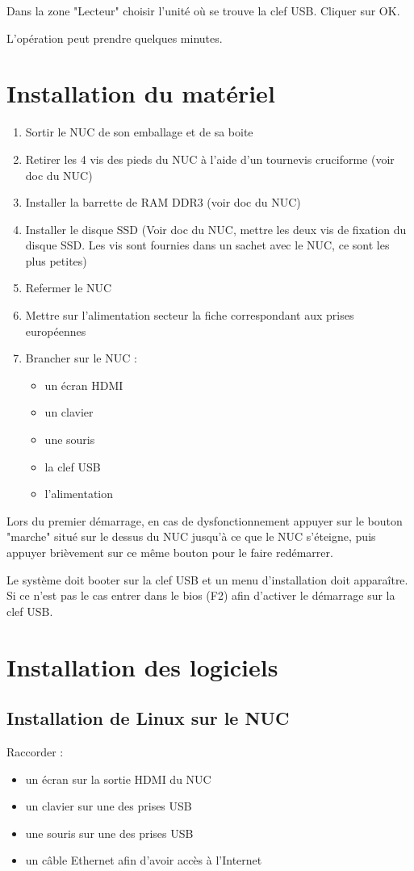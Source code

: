 \documentclass[a4paper]{ffco-rapport}
\begin{document}
Dans la zone "Lecteur" choisir l'unité où se trouve la clef USB. Cliquer sur OK.

L'opération peut prendre quelques minutes.

\chapter{Installation du matériel}

\begin{enumerate}
	\item Sortir le NUC de son emballage et de sa boite
	\item Retirer les 4 vis des pieds du NUC à l'aide d'un tournevis cruciforme (voir doc du NUC)
	\item Installer la barrette de RAM DDR3 (voir doc du NUC)
	\item Installer le disque SSD (Voir doc du NUC, mettre les deux vis de fixation du disque SSD. Les vis sont fournies dans un sachet avec le NUC, ce sont les plus petites)
	\item Refermer le NUC
	\item Mettre sur l'alimentation secteur la fiche correspondant aux prises européennes
	\item Brancher sur le NUC :
	\begin{itemize}
		\item un écran HDMI
		\item un clavier
		\item une souris
		\item la clef USB
		\item l'alimentation
	\end{itemize}
\end{enumerate}

Lors du premier démarrage, en cas de dysfonctionnement appuyer sur le bouton "marche" situé sur le dessus du NUC jusqu'à ce que le NUC s'éteigne, puis appuyer brièvement sur ce même bouton pour le faire redémarrer.

Le système doit booter sur la clef USB et un menu d'installation doit apparaître. Si ce n'est pas le cas entrer dans le bios (F2) afin d'activer le démarrage sur la clef USB.

\chapter{Installation des logiciels}

\section{Installation de Linux sur le NUC}
Raccorder :
\begin{itemize}
	\item un écran sur la sortie HDMI du NUC
	\item un clavier sur une des prises USB
	\item une souris sur une des prises USB
	\item un câble Ethernet afin d'avoir accès à l'Internet
\end{itemize}
\end{document}
